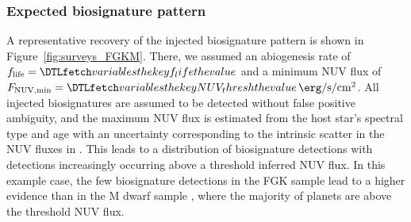 \documentclass[twocolumn,twocolappendix,linenumbers]{aastex631}
\begin{document}
\subsubsection{Expected biosignature pattern}
A representative recovery of the injected biosignature pattern is shown in Figure~\ref{fig:surveys_FGKM}.
There, we assumed an abiogenesis rate of $f_\mathrm{life} = \var{f_life}$ and a minimum \gls{NUV} flux of $F_\mathrm{NUV, min} = \var{NUV_thresh}\,\SI{}{\erg\per\second\per\centi\meter\squared}$.
All injected biosignatures are assumed to be detected without false positive ambiguity, and the maximum \gls{NUV} flux is estimated from the host star's spectral type and age with an uncertainty corresponding to the intrinsic scatter in the \gls{NUV} fluxes in \citet{Richey-Yowell2023}.
This leads to a distribution of biosignature detections with detections increasingly occurring above a threshold inferred \gls{NUV} flux.
In this example case, the few biosignature detections in the FGK sample lead to a higher evidence %
than in the M dwarf sample%
, where the majority of planets are above the threshold \gls{NUV} flux.
\end{document}
